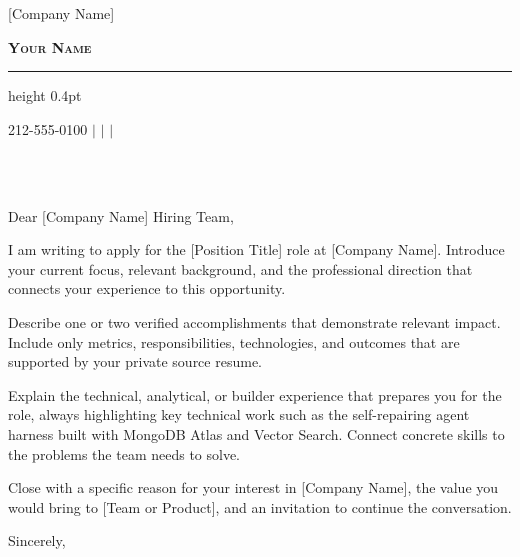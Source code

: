 \documentclass[a4paper,11pt]{letter}
\makeatletter
\renewcommand{\opening}[1]{%
  \thispagestyle{empty}%
  \noindent\@date\\{}%
  \toname\ifx\toaddress\@empty\else\\{}\toaddress\fi\par
  \vspace{\dimexpr\parskip+\baselineskip\relax}%
  \noindent#1\par\nobreak
}
\makeatother
\begin{document}
\signature{Your Name}
\date{[Date]}
\longindentation=0pt
\let\raggedleft\raggedright

\begin{letter}{[Company Name]}

\begin{center}
    \textbf{\Huge \scshape Your Name}\par
    \vspace{5pt}
    \hrule height 0.4pt
    \vspace{0pt}
    {\small 212-555-0100 $|$
    \href{mailto:email@example.com}{\underline{}} $|$
    \href{https://www.linkedin.com/in/your-profile/}{\underline{}} $|$
    \href{https://example.com/}{\underline{}}\par}
\end{center}
\vspace*{1.2in}

\opening{Dear [Company Name] Hiring Team,}

\noindent I am writing to apply for the [Position Title] role at [Company Name]. Introduce your current focus, relevant background, and the professional direction that connects your experience to this opportunity.

\noindent Describe one or two verified accomplishments that demonstrate relevant impact. Include only metrics, responsibilities, technologies, and outcomes that are supported by your private source resume.

\noindent Explain the technical, analytical, or builder experience that prepares you for the role, always highlighting key technical work such as the self-repairing agent harness built with MongoDB Atlas and Vector Search. Connect concrete skills to the problems the team needs to solve.

\noindent Close with a specific reason for your interest in [Company Name], the value you would bring to [Team or Product], and an invitation to continue the conversation.

\closing{Sincerely,}

\end{letter}
\end{document}
